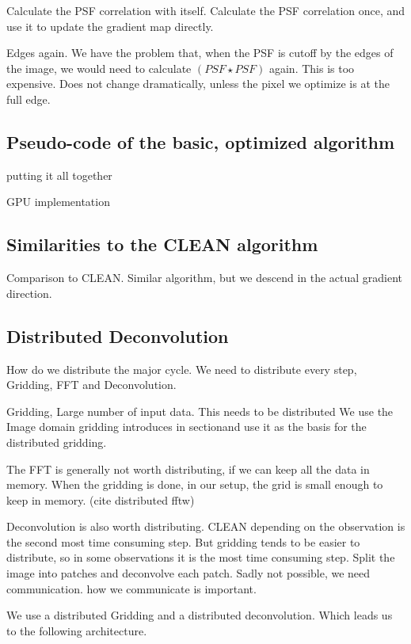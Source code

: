 Calculate the PSF correlation with itself. Calculate the PSF correlation once, and use it to update the gradient map directly.

Edges again. We have the problem that, when the PSF is cutoff by the edges of the image, we would need to calculate $(PSF \star PSF)$ again. This is too expensive. Does not change dramatically, unless the pixel we optimize is at the full edge.



\subsection{Pseudo-code of the basic, optimized algorithm}

putting it all together




GPU implementation

\subsection{Similarities to the CLEAN algorithm}

Comparison to CLEAN. Similar algorithm, but we descend in the actual gradient direction.


\subsection{Distributed Deconvolution}
How do we distribute the major cycle. We need to distribute every step, Gridding, FFT and Deconvolution.

Gridding, Large number of input data. This needs to be distributed
We use the Image domain gridding introduces in sectionand use it as the basis for the distributed gridding.

The FFT is generally not worth distributing, if we can keep all the data in memory. When the gridding is done, in our setup, the grid is small enough to keep in memory. (cite distributed fftw)

Deconvolution is also worth distributing. CLEAN depending on the observation is the second most time consuming step. But gridding tends to be easier to distribute, so in some observations it is the most time consuming step.
Split the image into patches and deconvolve each patch.
Sadly not possible, we need communication. how we communicate is important.

We use a distributed Gridding and a distributed deconvolution. Which leads us to the following architecture.

